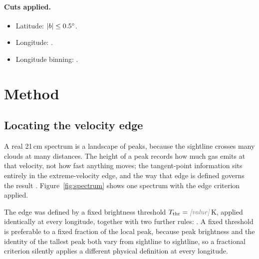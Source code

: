 \documentclass[11pt,a4paper]{article}
\begin{document}
\paragraph{Cuts applied.}
\begin{itemize}\itemsep2pt
  \item Latitude: $|b| \le 0.5^{\circ}$. 
  \item Longitude: . 
  \item Longitude binning: . 
\end{itemize}

\section{Method}
\label{sec:method}

\subsection{Locating the velocity edge}
\label{sec:edge}

A real 21\,cm spectrum is a landscape of peaks, because the sightline
crosses many clouds at many distances. The height of a peak records how
much gas emits at that velocity, not how fast anything moves; the
tangent-point information sits entirely in the extreme-velocity edge, and
the way that edge is defined governs the result \citep{mcclure2007}.
Figure~\ref{fig:spectrum} shows one spectrum with the edge criterion
applied.

The edge was defined by a fixed brightness threshold
$\Tthr = \ph{value}$\,K, applied identically at every longitude, together
with two further rules: . A fixed threshold is preferable to a fixed fraction of
the local peak, because peak brightness and the identity of the tallest
peak both vary from sightline to sightline, so a fractional criterion
silently applies a different physical definition at every longitude.
\end{document}
